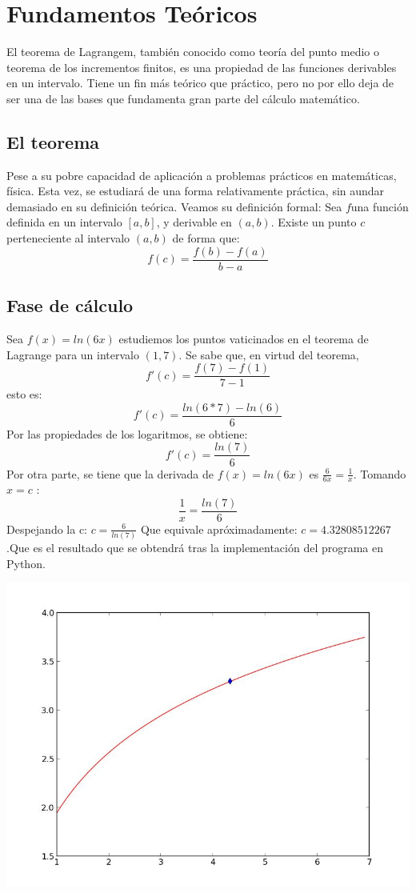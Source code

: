 \documentclass[14pt]{report}
\begin{document}
\chapter{Fundamentos Teóricos}
El teorema de Lagrangem, también conocido como teoría del punto medio o teorema de los incrementos finitos, es una propiedad de las funciones derivables en un intervalo.
Tiene un fin más teórico que práctico, pero no por ello deja de ser una de las bases que fundamenta gran parte del cálculo matemático.
\section{El teorema}
Pese a su pobre capacidad de aplicación a problemas prácticos en matemáticas, física. Esta vez, se estudiará de una forma relativamente práctica, sin aundar demasiado en su definición teórica.
Veamos su definición formal:
Sea $ f $una función definida en un intervalo $ [a,b] $, y derivable en $ (a,b) $. Existe un punto $ c $ perteneciente al intervalo $ (a,b) $ de forma que: \\
\[ f(c)=\frac{f(b) - f(a)}{b - a} \]

\section{Fase de cálculo}

Sea $ f(x)=ln(6x) $ estudiemos los puntos vaticinados en el teorema de Lagrange para un intervalo $ (1,7) $. Se sabe que, en virtud del teorema, 
\[f'(c)= \frac{f(7)-f(1)}{7-1} \] esto es: \[ f'(c) = \frac{ln(6*7)-ln(6)}{6} \] Por las propiedades de los logaritmos, se obtiene:
\[f'(c)= \frac{ln(7)}{6} \]
Por otra parte, se tiene que la derivada de $ f(x)= ln(6x) $ es $ \frac{6}{6x} = \frac{1}{x} $. Tomando $ x=c $ :
\[ \frac{1}{x} = \frac{ln(7)}{6} \] 
Despejando la c: $ c= \frac{6}{ln(7)} $ Que equivale apróximadamente: $ c = 4.32808512267 $ .Que es el resultado que se obtendrá tras la implementación del programa
en Python.

\includegraphics[scale=0.55]{graficofinal.jpeg}
\end{document}
